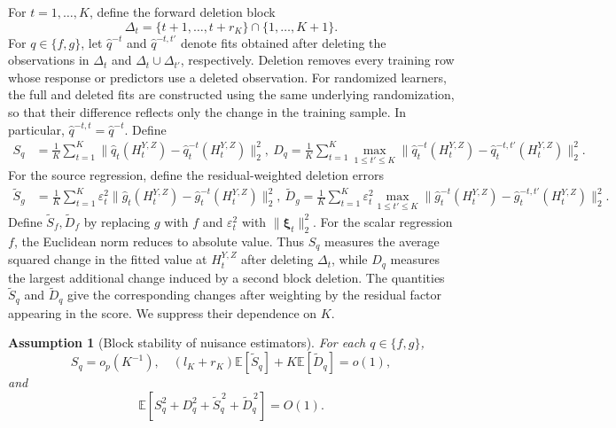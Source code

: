 \documentclass[12pt]{article}
\def\E{\mathbb{E}}
\newtheorem{assumption}[theorem]{Assumption}
\numberwithin{equation}{section}
\begin{document}
For \(t=1,\ldots,K\), define the forward deletion block
\begin{equation}
    \Delta_t=\{t+1,\ldots,t+r_K\}\cap\{1,\ldots,K+1\}.
\end{equation}
For \(q\in\{f,g\}\), let \(\hat q^{-t}\) and
\(\hat q^{-t,t'}\) denote fits obtained after deleting the observations
in \(\Delta_t\) and \(\Delta_t\cup\Delta_{t'}\), respectively.
Deletion removes every training row whose response or predictors use a
deleted observation. For randomized learners, the full and deleted fits
are constructed using the same underlying randomization, so that their
difference reflects only the change in the training sample. In particular,
\(\hat q^{-t,t}=\hat q^{-t}\). Define
\begin{align*}
S_q
&=\frac1K\sum_{t=1}^K
\big\|\hat q_t(H_t^{Y,Z})-\hat q_t^{-t}(H_t^{Y,Z})\big\|_2^2,
~D_q
=\frac1K\sum_{t=1}^K\max_{1\le t'\le K}
\big\|\hat q_t^{-t}(H_t^{Y,Z})
      -\hat q_t^{-t,t'}(H_t^{Y,Z})\big\|_2^2.
\end{align*}
For the source regression, define the residual-weighted deletion errors
\begin{align*}
\tilde S_g
&=\frac1K\sum_{t=1}^K\varepsilon_t^2
\big\|\hat g_t(H_t^{Y,Z})-\hat g_t^{-t}(H_t^{Y,Z})\big\|_2^2,
~\tilde D_g=\frac1K\sum_{t=1}^K\varepsilon_t^2
\max_{1\le t'\le K}
\big\|\hat g_t^{-t}(H_t^{Y,Z})
      -\hat g_t^{-t,t'}(H_t^{Y,Z})\big\|_2^2.
\end{align*}
Define \(\tilde S_f,\tilde D_f\) by replacing \(g\) with \(f\) and
\(\varepsilon_t^2\) with \(\|\boldsymbol\xi_t\|_2^2\).
For the scalar regression \(f\), the Euclidean norm reduces to absolute
value. Thus \(S_q\) measures the average squared change in the fitted value
at \(H_t^{Y,Z}\) after deleting \(\Delta_t\), while \(D_q\) measures the
largest additional change induced by a second block deletion.
The quantities \(\tilde S_q\) and \(\tilde D_q\) give the corresponding
changes after weighting by the residual factor appearing in the score.
We suppress their dependence on \(K\).

\begin{assumption}[Block stability of nuisance estimators]
\label{ass:stability}
For each \(q\in\{f,g\}\),
\begin{equation}
\label{eq:stability}
S_q=o_p(K^{-1}),\quad
(l_K+r_K)\E[\tilde S_q]+K\E[\tilde D_q]=o(1),
\end{equation}
and
\begin{equation}
\label{eq:stability-moments}
\E[S_q^2+D_q^2+\tilde S_q^{\,2}+\tilde D_q^{\,2}]
=O(1).
\end{equation}
\end{assumption}
\end{document}
